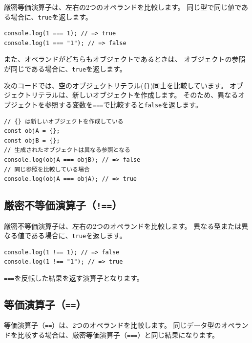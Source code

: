 厳密等価演算子は、左右の2つのオペランドを比較します。
同じ型で同じ値である場合に、\texttt{true}を返します。

\begin{lstlisting}
console.log(1 === 1); // => true
console.log(1 === "1"); // => false
\end{lstlisting}

また、オペランドがどちらもオブジェクトであるときは、
オブジェクトの参照が同じである場合に、\texttt{true}を返します。

次のコードでは、空のオブジェクトリテラル(\texttt{\{\}})同士を比較しています。
オブジェクトリテラルは、新しいオブジェクトを作成します。
そのため、異なるオブジェクトを参照する変数を\texttt{===}で比較すると\texttt{false}を返します。

\begin{lstlisting}
// {} は新しいオブジェクトを作成している
const objA = {};
const objB = {};
// 生成されたオブジェクトは異なる参照となる
console.log(objA === objB); // => false
// 同じ参照を比較している場合
console.log(objA === objA); // => true
\end{lstlisting}

\hypertarget{strict-not-equal-operator}{%
\subsection{\texorpdfstring{厳密不等価演算子（\texttt{!==}）}{厳密不等価演算子（!==）}}\label{strict-not-equal-operator}}

厳密不等価演算子は、左右の2つのオペランドを比較します。
異なる型または異なる値である場合に、\texttt{true}を返します。

\begin{lstlisting}
console.log(1 !== 1); // => false
console.log(1 !== "1"); // => true
\end{lstlisting}

\texttt{===}を反転した結果を返す演算子となります。

\hypertarget{equal-operator}{%
\subsection{\texorpdfstring{等価演算子（\texttt{==}）}{等価演算子（==）}}\label{equal-operator}}

等価演算子（\texttt{==}）は、2つのオペランドを比較します。
同じデータ型のオペランドを比較する場合は、厳密等価演算子（\texttt{===}）と同じ結果になります。

